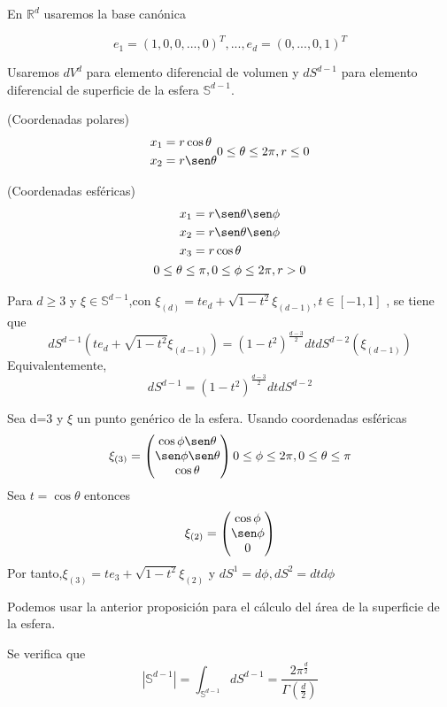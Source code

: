 En $\mathds{R}^d$ usaremos la base canónica 

$$ e_1 =(1,0,0,...,0)^T ,...,e_d=(0,...,0,1)^T $$

Usaremos $dV^d$ para elemento diferencial de volumen y $dS^{d-1}$ para elemento diferencial de superficie de la esfera $\mathds{S}^{d-1}$.

\begin{prop}(Coordenadas polares)
\begin{gather}
\begin{aligned}
x_1 &= r \cos \theta \\
x_2 &= r \sen \theta \\
\end{aligned}
0 \le \theta \le 2\pi, r\le 0
\end{gather}
\end{prop}

\begin{prop}(Coordenadas esféricas)
\begin{gather*}
\begin{aligned}
x_1 &= r \sen \theta \sen \phi\\
x_2 &= r \sen \theta \sen \phi\\
x_3 &= r \cos \theta\\
\end{aligned}
\\
0\le \theta \le \pi,0\le\phi\le2\pi,r>0
\end{gather*} 
\end{prop}
\begin{prop}Para $d \ge 3$ y $\xi \in \mathds{S}^{d-1}$,con $\xi_{(d)} = te_d+\sqrt{1-t^2}\xi_{(d-1)},  t\in[-1,1]$ , se tiene que
	$$
	dS^{d-1}(te_d+\sqrt{1-t^2}\xi_{(d-1)}) = (1-t^2)^{\frac{d-3}{2}}dt  dS^{d-2}(\xi_{(d-1)})
	$$
	Equivalentemente,
	$$
	dS^{d-1} = (1-t^2)^{\frac{d-3}{2}}dt dS^{d-2}
	$$
\end{prop}
\begin{example}Sea d=3 y $\xi$ un punto genérico de la esfera. Usando coordenadas esféricas $$
	\xi_{(3)}=\begin{pmatrix}
	\cos\phi \sen\theta\\
	\sen\phi \sen\theta\\
	\cos\theta\\
	\end{pmatrix}
	0 \le \phi \le 2\pi , 0 \le \theta \le \pi
	$$
	Sea $t=\cos\theta$ entonces
	$$
	\xi_{(2)} = \begin{pmatrix}
	\cos\phi\\
	\sen\phi\\
	0\\
	\end{pmatrix}
	$$
	Por tanto,$ \xi_{(3)} = te_3 + \sqrt{1-t^2} \xi_{(2)}$ y $dS^1 = d\phi , dS^2 = dtd\phi$
	
\end{example}
Podemos usar la anterior proposición para el cálculo del área de la superficie de la esfera.
\begin{prop}Se verifica que
	$$
	|\mathds{S}^{d-1}| = \int_{\mathds{S}^{d-1}} dS^{d-1} = \frac{2\pi^\frac{d}{2}}{\Gamma(\frac{d}{2})}
	$$
\end{prop} 

